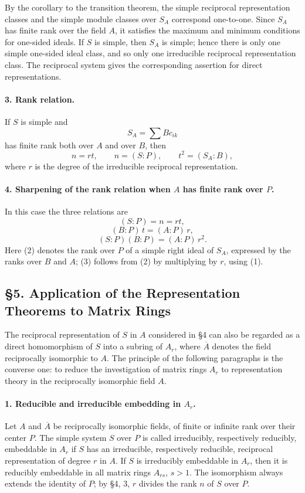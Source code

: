 \documentclass[11pt]{article}
\begin{document}
By the corollary to the transition theorem, the simple reciprocal representation classes and the simple module classes over \(S_A\) correspond one-to-one. Since \(S_A\) has finite rank over the field \(A\), it satisfies the maximum and minimum conditions for one-sided ideals. If \(S\) is simple, then \(S_A\) is simple; hence there is only one simple one-sided ideal class, and so only one irreducible reciprocal representation class. The reciprocal system gives the corresponding assertion for direct representations.

\paragraph{3. Rank relation.}
If \(S\) is simple and
\[
        S_A=\sum Bc_{ik}
\]
has finite rank both over \(A\) and over \(B\), then
\[
        n=rt,\qquad n=(S:P),\qquad t^2=(S_A:B),                         \tag{1}
\]
where \(r\) is the degree of the irreducible reciprocal representation.

\paragraph{4. Sharpening of the rank relation when \(A\) has finite rank over \(P\).}
In this case the three relations are
\[
        (S:P)=n=rt,                                                     \tag{1}
\]
\[
        (B:P)\,t=(A:P)\,r,                                               \tag{2}
\]
\[
        (S:P)(B:P)=(A:P)\,r^2.                                           \tag{3}
\]
Here (2) denotes the rank over \(P\) of a simple right ideal of \(S_A\), expressed by the ranks over \(B\) and \(A\); (3) follows from (2) by multiplying by \(r\), using (1).

\subsection*{§5. Application of the Representation Theorems to Matrix Rings}

The reciprocal representation of \(S\) in \(A\) considered in §4 can also be regarded as a direct homomorphism of \(S\) into a subring of \(A_r\), where \(\overline A\) denotes the field reciprocally isomorphic to \(A\). The principle of the following paragraphs is the converse one: to reduce the investigation of matrix rings \(A_r\) to representation theory in the reciprocally isomorphic field \(A\).

\paragraph{1. Reducible and irreducible embedding in \(A_r\).}
Let \(A\) and \(\overline A\) be reciprocally isomorphic fields, of finite or infinite rank over their center \(P\). The simple system \(S\) over \(P\) is called irreducibly, respectively reducibly, embeddable in \(A_r\) if \(S\) has an irreducible, respectively reducible, reciprocal representation of degree \(r\) in \(A\). If \(S\) is irreducibly embeddable in \(A_r\), then it is reducibly embeddable in all matrix rings \(A_{rs}\), \(s>1\). The isomorphism always extends the identity of \(P\); by §4, 3, \(r\) divides the rank \(n\) of \(S\) over \(P\).
\end{document}
